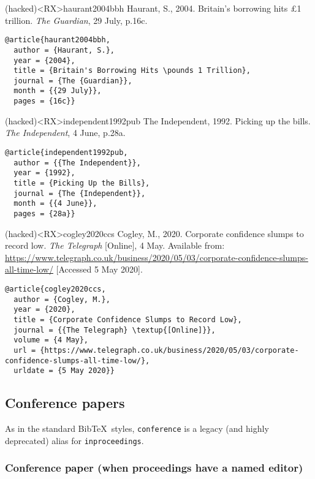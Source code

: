 \documentclass[10pt,a4paper]{article}
\newenvironment{info}{%
  \begin{list}{\makebox[2em][c]{\faInfoCircle}}{%
    \setlength{\leftmargin}{2em}
    \setlength{\labelwidth}{2em}
    \setlength{\labelsep}{0pt}}
}{\end{list}}
\begin{document}
\begin{bibexbox}(hacked)<RX>{haurant2004bbh}
  Haurant, S., 2004. Britain's borrowing hits £1 trillion. \emph{The Guardian}, 29 July, p.16c.
  \tcblower
\begin{Verbatim}
@article{haurant2004bbh,
  author = {Haurant, S.},
  year = {2004},
  title = {Britain's Borrowing Hits \pounds 1 Trillion},
  journal = {The {Guardian}},
  month = {{29 July}},
  pages = {16c}}
\end{Verbatim}
\end{bibexbox}


\begin{bibexbox}(hacked)<RX>{independent1992pub}
  The Independent, 1992. Picking up the bills. \emph{The Independent}, 4 June, p.28a.
  \tcblower
\begin{Verbatim}
@article{independent1992pub,
  author = {{The Independent}},
  year = {1992},
  title = {Picking Up the Bills},
  journal = {The {Independent}},
  month = {{4 June}},
  pages = {28a}}
\end{Verbatim}
\end{bibexbox}

\begin{bibexbox}(hacked)<RX>{cogley2020ccs}
  Cogley, M., 2020. Corporate confidence slumps to record low. \emph{The Telegraph} [Online], 4 May. Available from: \url{https://www.telegraph.co.uk/business/2020/05/03/corporate-confidence-slumps-all-time-low/} [Accessed 5 May 2020].
  \tcblower
\begin{Verbatim}
@article{cogley2020ccs,
  author = {Cogley, M.},
  year = {2020},
  title = {Corporate Confidence Slumps to Record Low},
  journal = {{The Telegraph} \textup{[Online]}},
  volume = {4 May},
  url = {https://www.telegraph.co.uk/business/2020/05/03/corporate-confidence-slumps-all-time-low/},
  urldate = {5 May 2020}}
\end{Verbatim}
\end{bibexbox}

\subsection{Conference papers}

\begin{info}\item
As in the standard Bib\TeX\ styles, \texttt{conference} is a legacy (and highly deprecated) alias for \texttt{inproceedings}.
\end{info}

\subsubsection*{Conference paper (when proceedings have a named editor)}
\end{document}
